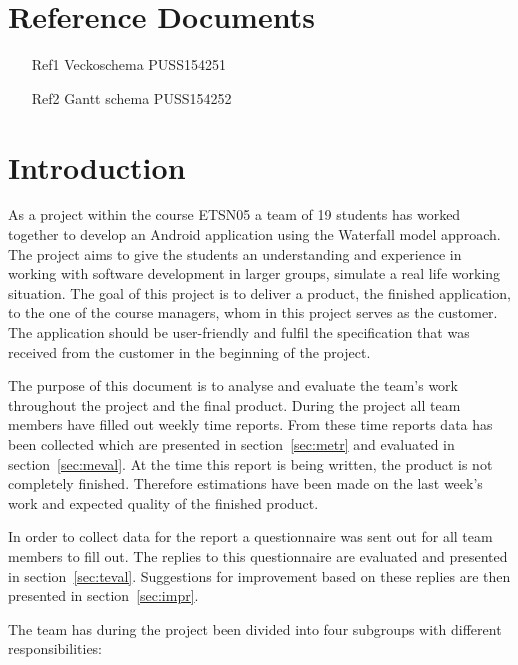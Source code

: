 \documentclass[a4paper]{article}
\begin{document}
\section{Reference Documents}
\begin{enumerate}

\item[Ref1] Veckoschema PUSS154251

\item[Ref2] Gantt schema PUSS154252 

\end{enumerate}


\section{Introduction}

As a project within the course ETSN05 a team of 19 students has worked together to develop an Android application using the Waterfall model approach. The project aims to give the students an understanding and experience in working with software development in larger groups, simulate a real life working situation. The goal of this project is to deliver a product, the finished application, to the one of the course managers, whom in this project serves as the customer. The application should be user-friendly and fulfil the specification that was received from the customer in the beginning of the project.

The purpose of this document is to analyse and evaluate the team’s work throughout the project and the final product. During the project all team members have filled out weekly time reports. From these time reports data has been collected which are presented in section~\ref{sec:metr} and evaluated in section~\ref{sec:meval}.
At the time this report is being written, the product is not completely finished. Therefore estimations have been made on the last week's work and expected quality of the finished product. 
 

In order to collect data for the report a questionnaire was sent out for all team members to fill out. The replies to this questionnaire are evaluated and presented in section~\ref{sec:teval}. Suggestions for improvement based on these replies are then presented in section~\ref{sec:impr}.

The team has during the project been divided into four subgroups with different responsibilities:
\end{document}
